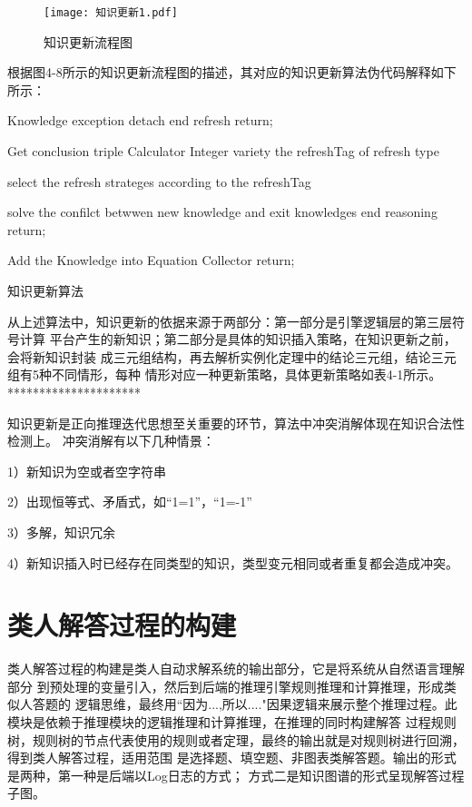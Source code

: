 \documentclass{standalone}
\begin{document}
\begin{figure}[htbp]
	\texttt{[image: 知识更新1.pdf]}
	\caption{知识更新流程图}
	\label{知识更新1}
\end{figure}
根据图4-8所示的知识更新流程图的描述，其对应的知识更新算法伪代码解释如下所示：
\begin{algorithm}[H]
    Knowledge exception detach\;
	 {
		end refresh\;
		return;
    }
	 {
		Get conclusion triple\;
		\quad Calculator Integer variety the refreshTag of refresh type\;
		 {
		select the refresh strateges according to the refreshTag\;
		 {
		solve the confilct betwwen new knowledge and exit knowledges\;
		 {
		end reasoning\;
		return;
    }
	
    }
    }
    }
	 {
		Add the Knowledge into Equation Collector\;
		return;
    }
	
	\caption{知识更新算法}
	\label{dfs}
\end{algorithm}
从上述算法中，知识更新的依据来源于两部分：第一部分是引擎逻辑层的第三层符号计算
平台产生的新知识；第二部分是具体的知识插入策略，在知识更新之前，会将新知识封装
成三元组结构，再去解析实例化定理中的结论三元组，结论三元组有5种不同情形，每种
情形对应一种更新策略，具体更新策略如表4-1所示。
*********************

知识更新是正向推理迭代思想至关重要的环节，算法中冲突消解体现在知识合法性检测上。
冲突消解有以下几种情景：

1）新知识为空或者空字符串

2）出现恒等式、矛盾式，如“1=1”，“1=-1”

3）多解，知识冗余

4）新知识插入时已经存在同类型的知识，类型变元相同或者重复都会造成冲突。

\section{类人解答过程的构建}
类人解答过程的构建是类人自动求解系统的输出部分，它是将系统从自然语言理解部分
到预处理的变量引入，然后到后端的推理引擎规则推理和计算推理，形成类似人答题的
逻辑思维，最终用“因为...,所以...."因果逻辑来展示整个推理过程。此模块是依赖于推理模块的逻辑推理和计算推理，在推理的同时构建解答
过程规则树，规则树的节点代表使用的规则或者定理，最终的输出就是对规则树进行回溯，得到类人解答过程，适用范围
是选择题、填空题、非图表类解答题。输出的形式是两种，第一种是后端以Log日志的方式；
方式二是知识图谱的形式呈现解答过程子图。
\end{document}
